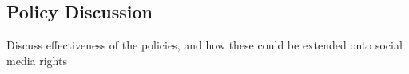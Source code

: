 \subsection{Policy Discussion}

Discuss effectiveness of the policies, and how these could be extended onto social media rights

















